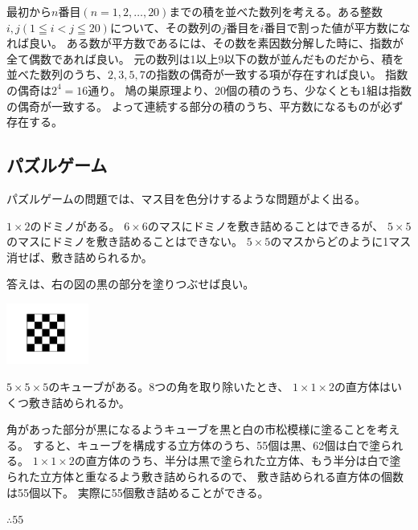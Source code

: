 \documentclass[uplatex,dvipdfmx]{jsbook}
\begin{document}
\begin{answer}
    最初から$n$番目$(n=1,2,\dots,20)$までの積を並べた数列を考える。ある整数$i,j( 1 \leqq i < j \leqq 20 )$について、その数列の$j$番目を$i$番目で割った値が平方数になれば良い。
    ある数が平方数であるには、その数を素因数分解した時に、指数が全て偶数であれば良い。
    元の数列は1以上9以下の数が並んだものだから、積を並べた数列のうち、$2,3,5,7$の指数の偶奇が一致する項が存在すれば良い。
    指数の偶奇は$2^4=16$通り。
    鳩の巣原理より、20個の積のうち、少なくとも1組は指数の偶奇が一致する。
    よって連続する部分の積のうち、平方数になるものが必ず存在する。
\end{answer}

\subsection{パズルゲーム}

パズルゲームの問題では、マス目を色分けするような問題がよく出る。

\begin{problem}[例題]
    $1\times 2$のドミノがある。
    $6\times 6$のマスにドミノを敷き詰めることはできるが、
    $5\times 5$のマスにドミノを敷き詰めることはできない。
    $5\times 5$のマスからどのように1マス消せば、敷き詰められるか。

    答えは、右の図の黒の部分を塗りつぶせば良い。

    \includegraphics[clip,height=2cm]{figures/c_example.pdf}
\end{problem}

\begin{problem}[練習問題1]
    $5 \times 5 \times 5$のキューブがある。8つの角を取り除いたとき、
    $1 \times 1 \times 2$の直方体はいくつ敷き詰められるか。
\end{problem}

\begin{answer}
    角があった部分が黒になるようキューブを黒と白の市松模様に塗ることを考える。
    すると、キューブを構成する立方体のうち、55個は黒、62個は白で塗られる。
    $1 \times 1 \times 2$の直方体のうち、半分は黒で塗られた立方体、もう半分は白で塗られた立方体と重なるよう敷き詰められるので、
    敷き詰められる直方体の個数は55個以下。
    実際に55個敷き詰めることができる。

    $\therefore 55$
\end{answer}
\end{document}
